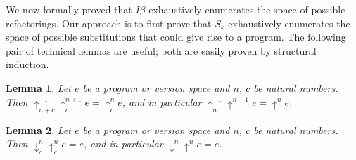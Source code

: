 \documentclass{article}
\newcommand{\shift}[1]{\uparrow^{#1}}
\newcommand{\downshift}[1]{\downarrow^{#1}}
\newtheorem{lemma}{Lemma}
\begin{document}
We now formally proved that $I\beta$ exhaustively enumerates the space of possible refactorings.
Our approach is to first prove that $S_k$ exhaustively enumerates
the space of possible substitutions that
could give rise to a program.
The following pair of technical lemmas are useful; both are easily proven by structural induction.
\begin{lemma}
  Let $e$ be a program or version space and $n$, $c$ be natural numbers. \\Then $\shift{-1}_{n + c}\shift{n + 1}_ce = \shift{n}_c e$,
  and in particular $\shift{-1}_{n}\shift{n + 1}e = \shift{n} e$.
\label{neutralizeShift}\end{lemma}
\begin{lemma}
  Let $e$ be a program or version space and $n$, $c$ be natural numbers. \\Then $\downshift{n}_{c}\shift{n}_ce =  e$,
  and in particular $\downshift{n}\shift{n}e =  e$.
  \label{neutralizeDown}
\end{lemma}
\end{document}
